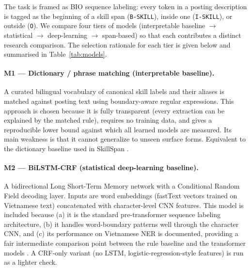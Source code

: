 \documentclass[12pt,a4paper]{article}
\begin{document}
The task is framed as BIO sequence labeling: every token in a posting
description is tagged as the beginning of a skill span (\texttt{B-SKILL}),
inside one (\texttt{I-SKILL}), or outside (\texttt{O}). We compare four
tiers of models (interpretable baseline $\to$ statistical $\to$
deep-learning $\to$ span-based) so that each contributes a distinct
research comparison. The selection rationale for each tier is given below
and summarised in Table~\ref{tab:models}.

\paragraph{M1 — Dictionary / phrase matching (interpretable baseline).}
A curated bilingual vocabulary of canonical skill labels and their aliases
is matched against posting text using boundary-aware regular expressions.
This approach is chosen because it is fully transparent (every extraction
can be explained by the matched rule), requires no training data, and
gives a reproducible lower bound against which all learned models are
measured. Its main weakness is that it cannot generalize to unseen surface
forms. Equivalent to the dictionary baseline used in SkillSpan
\cite{skillspan}.

\paragraph{M2 — BiLSTM-CRF (statistical deep-learning baseline).}
A bidirectional Long Short-Term Memory network with a Conditional Random
Field decoding layer. Inputs are word embeddings (fastText vectors trained
on Vietnamese text) concatenated with character-level CNN features. This
model is included because (a) it is the standard pre-transformer sequence
labeling architecture, (b) it handles word-boundary patterns well through
the character CNN, and (c) its performance on Vietnamese NER is documented,
providing a fair intermediate comparison point between the rule baseline
and the transformer models \cite{phobert}. A CRF-only variant (no LSTM,
logistic-regression-style features) is run as a lighter check.
\end{document}
